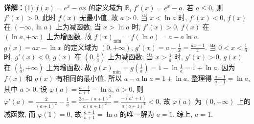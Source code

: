 \begin{question}[points=12]
\begin{solution}
\textbf{详解：}(1) $f(x) = e^x - ax$ 的定义域为 $\mathbb{R}$, $f'(x) = e^x - a$. 若 $a \le 0$, 则 $f'(x) > 0$, 此时 $f(x)$ 无最小值, 故 $a > 0$. 当 $x < \ln a$ 时, $f'(x) < 0$, $f(x)$ 在 $(-\infty, \ln a)$ 上为减函数; 当 $x > \ln a$ 时, $f'(x) > 0$, $f(x)$ 在 $(\ln a, +\infty)$ 上为增函数. 故 $f(x)_{\min} = f(\ln a) = a - a\ln a$. $g(x) = ax - \ln x$ 的定义域为 $(0, +\infty)$, $g'(x) = a - \frac{1}{x} = \frac{ax-1}{x}$. 当 $0 < x < \frac{1}{a}$ 时, $g'(x) < 0$, $g(x)$ 在 $(0, \frac{1}{a})$ 上为减函数; 当 $x > \frac{1}{a}$ 时, $g'(x) > 0$, $g(x)$ 在 $(\frac{1}{a}, +\infty)$ 上为增函数. 故 $g(x)_{\min} = g\left(\frac{1}{a}\right) = 1 - \ln\frac{1}{a} = 1 + \ln a$. 因为 $f(x)$ 和 $g(x)$ 有相同的最小值, 所以 $a - a\ln a = 1 + \ln a$, 整理得 $\frac{a-1}{a+1} = \ln a$, 其中 $a > 0$. 设 $\varphi(a) = \frac{a-1}{a+1} - \ln a$, $a > 0$, 则 $\varphi'(a) = \frac{2}{(a+1)^2} - \frac{1}{a} = \frac{2a - (a+1)^2}{a(a+1)^2} = \frac{-(a^2+1)}{a(a+1)^2} < 0$, 故 $\varphi(a)$ 为 $(0, +\infty)$ 上的减函数, 而 $\varphi(1) = 0$, 故 $\frac{a-1}{a+1} = \ln a$ 的唯一解为 $a = 1$. 综上, $a = 1$.

\end{solution}
\end{question}

